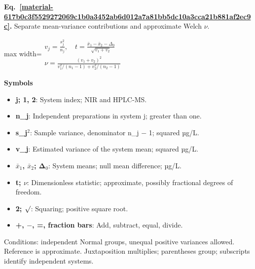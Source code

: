 \documentclass[11pt,a4paper]{article}
\begin{document}
\par\medskip
\noindent\begin{minipage}{\linewidth}
\label{material-617b0c3f5529272069c1b0a3452ab6d012a7a81bb5dc10a3cca21b881af2ec9c}
\noindent\textbf{Eq.~\ref*{material-617b0c3f5529272069c1b0a3452ab6d012a7a81bb5dc10a3cca21b881af2ec9c}.} Separate mean-variance contributions and approximate Welch \ensuremath{\nu}.\par\nopagebreak
\begin{center}\begin{adjustbox}{max width=\linewidth}$\displaystyle \begin{gathered}v_j=\frac{s_j^2}{n_j},\quad t=\frac{\bar x_1-\bar x_2-\Delta_0}{\sqrt{v_1+v_2}}\\\nu=\frac{(v_1+v_2)^2}{v_1^2/(n_1-1)+v_2^2/(n_2-1)}\end{gathered}$\end{adjustbox}\end{center}

\par\noindent\textbf{Symbols}

\begin{itemize}\setlength{\itemsep}{1pt}\setlength{\parsep}{0pt}
\item \textbf{j; 1, 2}: System index; NIR and HPLC-MS.
\item \textbf{n\_j}: Independent preparations in system j; greater than one.
\item \textbf{s\_j\ensuremath{{}^2}}: Sample variance, denominator n\_j \ensuremath{-} 1; squared µg/L.
\item \textbf{v\_j}: Estimated variance of the system mean; squared µg/L.
\item \textbf{\ensuremath{\bar{x}}\ensuremath{{}_1}, \ensuremath{\bar{x}}\ensuremath{{}_2}; Δ\ensuremath{{}_0}}: System means; null mean difference; µg/L.
\item \textbf{t; \ensuremath{\nu}}: Dimensionless statistic; approximate, possibly fractional degrees of freedom.
\item \textbf{2; \ensuremath{\sqrt{\vphantom{x}}}}: Squaring; positive square root.
\item \textbf{+, \ensuremath{-}, =, fraction bars}: Add, subtract, equal, divide.
\end{itemize}

Conditions: independent Normal groups, unequal positive variances allowed. Reference is approximate. Juxtaposition multiplies; parentheses group; subscripts identify independent systems.

\end{minipage}\par
\medskip
\end{document}
